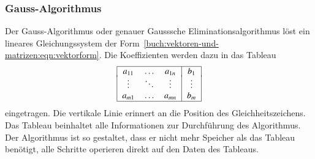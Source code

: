 \subsubsection{Gauss-Algorithmus}
Der Gauss-Algorithmus oder genauer Gausssche Eliminationsalgorithmus
löst ein lineares Gleichungssystem der
%
%
Form~\eqref{buch:vektoren-und-matrizen:eqn:vektorform}.
Die Koeffizienten werden dazu in das Tableau
\[
\begin{tabular}{|>{$}c<{$}>{$}c<{$}>{$}c<{$}|>{$}c<{$}|}
\hline
a_{11}&\dots &a_{1n}&b_1   \\[-2pt]
\vdots&\ddots&\vdots&\vdots\\
a_{m1}&\dots &a_{mn}&b_m   \\
\hline
\end{tabular}
\]
eingetragen.
Die vertikale Linie erinnert an die Position des Gleichheitszeichens.
Das Tableau beinhaltet alle Informationen zur Durchführung des Algorithmus.
Der Algorithmus ist so gestaltet, dass er nicht mehr Speicher als
das Tableau benötigt, alle Schritte operieren direkt auf den Daten
des Tableaus.

